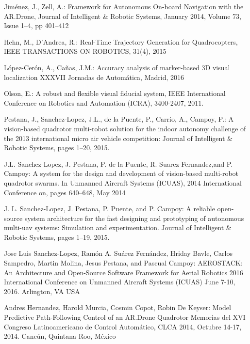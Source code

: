 \documentclass{styles/svproc}
\begin{document}
\begin{thebibliography}{6}
Jiménez, J., Zell, A.: Framework for Autonomous On-board Navigation with the AR.Drone, Journal of Intelligent \& Robotic Systems, January 2014, Volume 73, Issue 1–4, pp 401–412

Hehn, M., D'Andrea, R.: Real-Time Trajectory Generation for Quadrocopters, IEEE TRANSACTIONS ON ROBOTICS,  31(4), 2015

López-Cerón, A., Cañas, J.M.: Accuracy analysis of marker-based 3D visual localization
 XXXVII Jornadas de Automática, Madrid, 2016 %

Olson, E.: A robust and flexible visual fiducial system, IEEE International Conference on Robotics and Automation (ICRA), 3400-2407, 2011.

  Pestana, J., Sanchez-Lopez, J.L., de la Puente, P., Carrio, A., Campoy, P.:
  A vision-based quadrotor multi-robot solution for the indoor autonomy challenge of the 2013 international micro air vehicle competition:
  Journal of Intelligent \& Robotic Systems, pages 1–20, 2015.
  
  J.L. Sanchez-Lopez, J. Pestana, P. de la Puente, R. Suarez-Fernandez,and P. Campoy:
  A system for the design and development of vision-based multi-robot quadrotor swarms.
  In Unmanned Aircraft Systems (ICUAS), 2014 International Conference on, pages 640–648, May 2014
  
  J. L. Sanchez-Lopez, J. Pestana, P. Puente, and P. Campoy:
  A reliable open-source system architecture for the fast designing and prototyping of autonomous multi-uav systems: Simulation and experimentation.
  Journal of Intelligent \& Robotic Systems, pages 1–19, 2015.

  Jose Luis Sanchez-Lopez, Ramón A. Suárez Fernández, Hriday Bavle, Carlos Sampedro, Martin Molina, Jesus Pestana, and Pascual Campoy:
  AEROSTACK: An Architecture and Open-Source Software Framework for Aerial Robotics
  2016 International Conference on Unmanned Aircraft Systems (ICUAS) June 7-10, 2016. Arlington, VA USA

  Andres Hernandez, Harold Murcia, Cosmin Copot, Robin De Keyser:
  Model Predictive Path-Following Control of an AR.Drone Quadrotor 
  Memorias del XVI Congreso Latinoamericano de Control Automático, CLCA 2014, Octubre 14-17, 2014. Cancún, Quintana Roo, México


\end{thebibliography}
\end{document}
